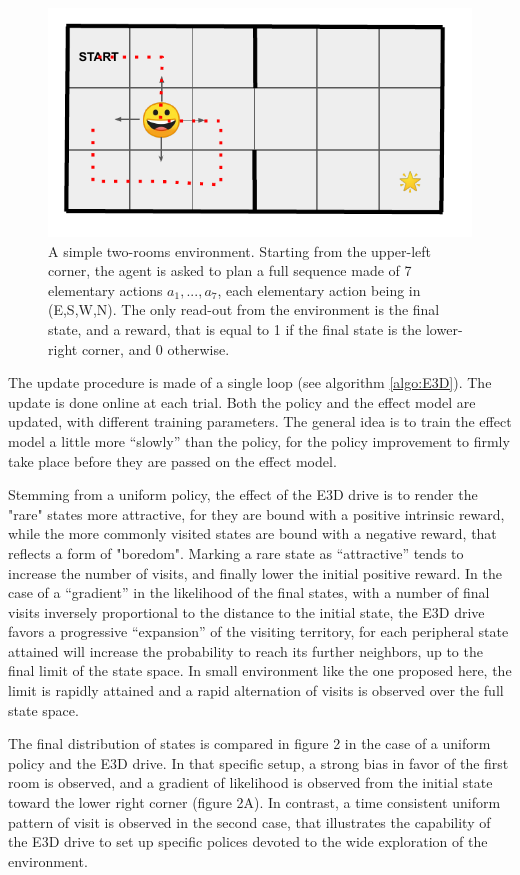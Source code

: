 \documentclass[runningheads]{llncs}
\begin{document}
\begin{figure}[t]\label{fig:grid1}
\centerline{
	\includegraphics[width = .4 \linewidth]{../figures/env-1.pdf} 
}
\caption{A simple two-rooms environment. Starting from the upper-left corner, the agent is asked to plan a full sequence made of 7 elementary actions $a_1,...,a_7$, each elementary action being in (E,S,W,N). The only read-out from the environment is the final state, and a reward, that is equal to 1 if the final state is the lower-right corner, and 0 otherwise.}
\end{figure}

The update procedure is made of a single loop (see algorithm \ref{algo:E3D}). The update is done online at each trial. Both the policy and the effect model are updated, with different training parameters. The general idea is to train the effect model a little more ``slowly'' than the policy, for the policy improvement to firmly take place before they are passed on the effect model. 

Stemming from a uniform policy, the effect of the E3D drive is to render the "rare" states more
attractive, for they are bound with a positive intrinsic reward, while the more commonly visited 
 states are bound with a negative reward, that reflects a form of "boredom". Marking a rare state as ``attractive'' tends to increase the number of visits, and finally lower the initial positive reward. In the case of a ``gradient'' in the likelihood of the final states, with a number of final visits inversely proportional to the distance to the initial state, the E3D drive favors a progressive ``expansion'' of the visiting territory, for each peripheral state attained will increase the probability to reach its further neighbors, up to the final limit of the state space. In small environment like the one proposed here, the limit is rapidly attained and a rapid alternation of visits is observed over the full state space. 

The final distribution of states is compared in figure 2 %
in the case of a uniform policy and the E3D drive. In that specific setup, a strong bias in favor of the first room is observed, and a gradient of likelihood is observed from the initial state toward the lower right corner (figure 2A). %
In contrast, a time consistent uniform pattern of visit is observed in the second case, that illustrates the capability of the E3D drive to set up specific polices devoted to the wide exploration of the environment.     
\end{document}
